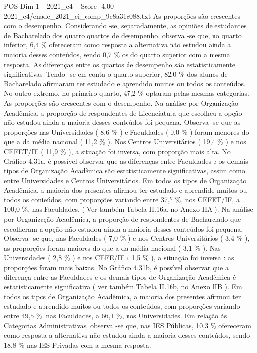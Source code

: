 \begin{textsample}{POS Dim 1 – 2021\_c4 – Score -4.00 – 2021\_c4/enade\_2021\_ci\_comp\_9c8a31e088.txt}
As proporções são crescentes com o desempenho.
Considerando -se, separadamente, as opiniões de estudantes de Bacharelado dos quatro quartos de desempenho, observa -se que, no quarto inferior, 6,4 \% ofereceram como resposta a alternativa não estudou ainda a maioria desses conteúdos, sendo 0,7 \% os do quarto superior com a mesma resposta.
As diferenças entre os quartos de desempenho são estatisticamente significativas.
Tendo -se em conta o quarto superior, 82,0 \% dos alunos de Bacharelado afirmaram ter estudado e aprendido muitos ou todos os conteúdos.
No outro extremo, no primeiro quarto, 47,2 \% optaram pelas mesmas categorias.
As proporções são crescentes com o desempenho.
Na análise por Organização Acadêmica, a proporção de respondentes de Licenciatura que escolheu a opção não estudou ainda a maioria desses conteúdos foi pequena.
Observa -se que as proporções nas Universidades ( 8,6 \% ) e Faculdades ( 0,0 \% ) foram menores do que a da média nacional ( 11,2 \% ).
Nos Centros Universitários ( 19,4 \% ) e nos CEFET/IF ( 11,9 \% ), a situação foi inversa, com proporção mais alta.
No Gráfico 4.31a, é possível observar que as diferenças entre Faculdades e os demais tipos de Organização Acadêmica são estatisticamente significativas, assim como entre Universidades e Centros Universitários.
Em todos os tipos de Organização Acadêmica, a maioria dos presentes afirmou ter estudado e aprendido muitos ou todos os conteúdos, com proporções variando entre 37,7 \%, nos CEFET/IF, a 100,0 \%, nas Faculdades. ( Ver também Tabela II.16a, no Anexo IIA ).
Na análise por Organização Acadêmica, a proporção de respondentes de Bacharelado que escolheram a opção não estudou ainda a maioria desses conteúdos foi pequena.
Observa -se que, nas Faculdades ( 7,0 \% ) e nos Centros Universitários ( 3,4 \% ), as proporções foram maiores do que a da média nacional ( 3,1 \% ).
Nas Universidades ( 2,8 \% ) e nos CEFE/IF ( 1,5 \% ), a situação foi inversa : as proporções foram mais baixas.
No Gráfico 4.31b, é possível observar que a diferença entre as Faculdades e os demais tipos de Organização Acadêmica é estatisticamente significativa ( ver também Tabela II.16b, no Anexo IIB ).
Em todos os tipos de Organização Acadêmica, a maioria dos presentes afirmou ter estudado e aprendido muitos ou todos os conteúdos, com proporções variando entre 49,5 \%, nas Faculdades, a 66,1 \%, nos Universidades.
Em relação às Categorias Administrativas, observa -se que, nas IES Públicas, 10,3 \% ofereceram como resposta a alternativa não estudou ainda a maioria desses conteúdos, sendo 18,8 \% nas IES Privadas com a mesma resposta.

\end{textsample}
